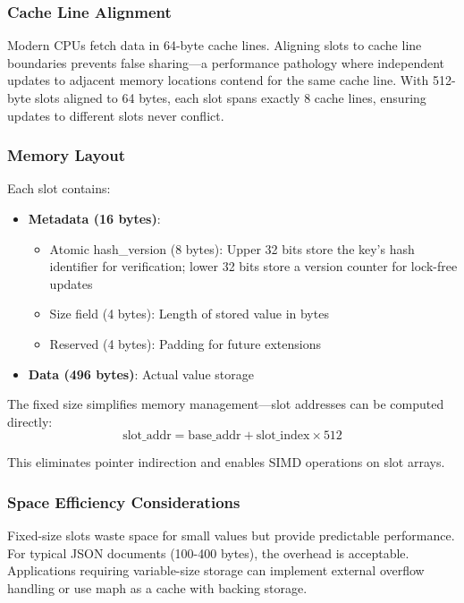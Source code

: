 \documentclass[10pt,conference]{IEEEtran}
\begin{document}
\subsubsection{Cache Line Alignment}
Modern CPUs fetch data in 64-byte cache lines. Aligning slots to cache line boundaries prevents false sharing—a performance pathology where independent updates to adjacent memory locations contend for the same cache line. With 512-byte slots aligned to 64 bytes, each slot spans exactly 8 cache lines, ensuring updates to different slots never conflict.

\subsubsection{Memory Layout}
Each slot contains:
\begin{itemize}
\item \textbf{Metadata (16 bytes)}:
  \begin{itemize}
  \item Atomic hash\_version (8 bytes): Upper 32 bits store the key's hash identifier for verification; lower 32 bits store a version counter for lock-free updates
  \item Size field (4 bytes): Length of stored value in bytes
  \item Reserved (4 bytes): Padding for future extensions
  \end{itemize}
\item \textbf{Data (496 bytes)}: Actual value storage
\end{itemize}

The fixed size simplifies memory management—slot addresses can be computed directly:
\begin{equation}
\text{slot\_addr} = \text{base\_addr} + \text{slot\_index} \times 512
\end{equation}

This eliminates pointer indirection and enables SIMD operations on slot arrays.

\subsubsection{Space Efficiency Considerations}
Fixed-size slots waste space for small values but provide predictable performance. For typical JSON documents (100-400 bytes), the overhead is acceptable. Applications requiring variable-size storage can implement external overflow handling or use maph as a cache with backing storage.
\end{document}
